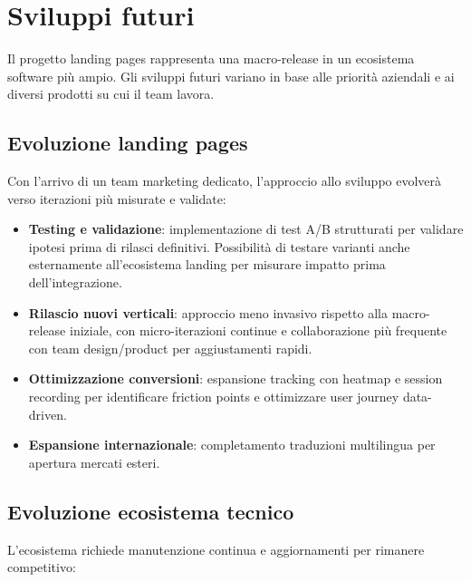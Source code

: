 \section{Sviluppi futuri}

Il progetto landing pages rappresenta una macro-release in un ecosistema software 
più ampio. Gli sviluppi futuri variano in base alle priorità aziendali e ai diversi 
prodotti su cui il team lavora.

\subsection{Evoluzione landing pages}

Con l'arrivo di un team marketing dedicato, l'approccio allo sviluppo evolverà 
verso iterazioni più misurate e validate:

\begin{itemize}
  \item \textbf{Testing e validazione}: implementazione di test A/B strutturati 
        per validare ipotesi prima di rilasci definitivi. Possibilità di testare 
        varianti anche esternamente all'ecosistema landing per misurare impatto 
        prima dell'integrazione.
  
  \item \textbf{Rilascio nuovi verticali}: approccio meno invasivo rispetto alla 
        macro-release iniziale, con micro-iterazioni continue e collaborazione 
        più frequente con team design/product per aggiustamenti rapidi.
  
  \item \textbf{Ottimizzazione conversioni}: espansione tracking con heatmap e 
        session recording per identificare friction points e ottimizzare user 
        journey data-driven.
  
  \item \textbf{Espansione internazionale}: completamento traduzioni multilingua 
        per apertura mercati esteri.
\end{itemize}

\subsection{Evoluzione ecosistema tecnico}

L'ecosistema richiede manutenzione continua e aggiornamenti per rimanere 
competitivo:

